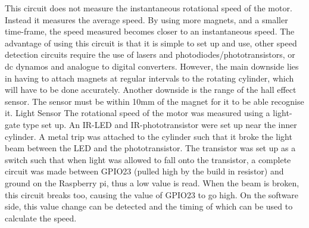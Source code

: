 \documentclass[twoside,a4]{report}
\def\br{\newline \newline \noindent}
\begin{document}
This circuit does not measure the instantaneous rotational speed of the motor. Instead it measures the average speed. By using more magnets, and a smaller time-frame, the speed measured becomes closer to an instantaneous speed. The advantage of using this circuit is that it is simple to set up and use, other speed detection circuits require the use of lasers and photodiodes/phototransistors, or dc dynamos and analogue to digital converters. However, the main downside lies in having to attach magnets at regular intervals to the rotating cylinder, which will have to be done accurately. Another downside is the range of the hall effect sensor. The sensor must be within 10mm of the magnet for it to be able recognise it. \newline \newline \noindent
\large Light Sensor \normalsize \br
The rotational speed of the motor was measured using a light-gate type set up. An IR-LED and IR-phototransistor were set up near the inner cylinder. A metal trip was attached to the cylinder such that it broke the light beam between the LED and the phototransistor. The transistor was set up as a switch such that when light was allowed to fall onto the transistor, a complete circuit was made between GPIO23 (pulled high by the build in resistor) and ground on the Raspberry pi, thus a low value is read. When the beam is broken, this circuit breaks too, causing the value of GPIO23 to go high. On the software side, this value change can be detected and the timing of which can be used to calculate the speed. \newline
\end{document}
